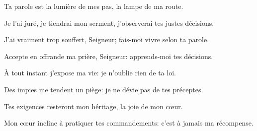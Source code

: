 \item Ta parole est la lumière de mes pas,
la lampe de ma route.

\item Je l’ai juré, je tiendrai mon serment,
j’observerai tes justes décisions.

\item J’ai vraiment trop souffert, Seigneur;
fais-moi vivre selon ta parole.

\item Accepte en offrande ma prière, Seigneur:
apprends-moi tes décisions.

\item À tout instant j’expose ma vie:
je n’oublie rien de ta loi.

\item Des impies me tendent un piège:
je ne dévie pas de tes préceptes.

\item Tes exigences resteront mon héritage,
la joie de mon cœur.

\item Mon cœur incline à pratiquer tes commandements:
c’est à jamais ma récompense.